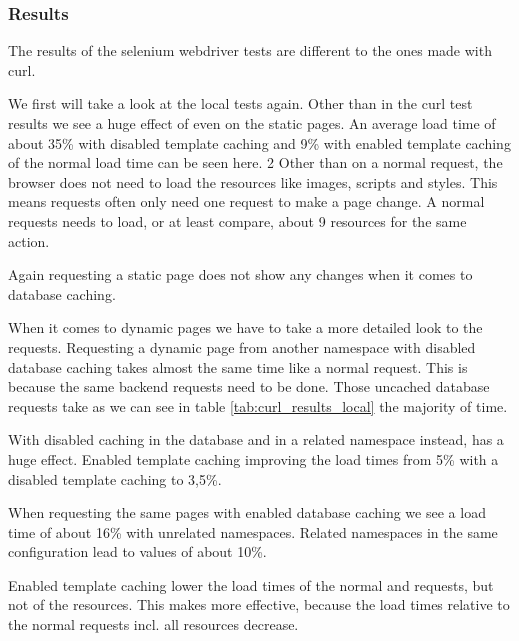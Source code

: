 \subsubsection{Results}

The results of the selenium webdriver tests are different to the ones made with curl.

We first will take a look at the local tests again.
Other than in the curl test results we see a huge effect of \lare{} even on the static pages.
An average \lare{} load time of about 35\% with disabled template caching and 9\% with enabled template caching of the normal load time can be seen here.   2
Other than on a normal request, the browser does not need to load the resources like images, scripts and styles.
This means \lare{} requests often only need one request to make a page change.
A normal requests needs to load, or at least compare, about 9 resources for the same action.

Again requesting a static page does not show any changes when it comes to database caching.

When it comes to dynamic pages we have to take a more detailed look to the requests.
Requesting a dynamic page from another \lare{} namespace with disabled database caching takes almost the same time like a normal request.
This is because the same backend requests need to be done.
Those uncached database requests take as we can see in table \ref{tab:curl_results_local} the majority of time.

With disabled caching in the database and in a related namespace instead, \lare{} has a huge effect.
Enabled template caching improving the load times from 5\% with a disabled template caching to 3,5\%.

When requesting the same pages with enabled database caching we see a \lare{} load time of about 16\% with unrelated namespaces.
Related namespaces in the same configuration lead to values of about 10\%.

Enabled template caching lower the load times of the normal and \lare{} requests, but not of the resources.
This makes \lare{} more effective, because the load times relative to the normal requests incl. all resources decrease.


